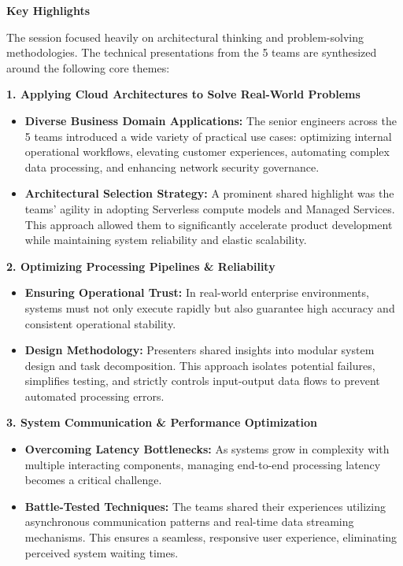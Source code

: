 \vspace{0.5em}\noindent\textbf{Key Highlights}

The session focused heavily on architectural thinking and
problem-solving methodologies. The technical presentations from the 5
teams are synthesized around the following core themes:

\vspace{0.5em}\noindent\textbf{1. Applying Cloud Architectures to Solve Real-World Problems}

\begin{itemize}
\tightlist
\item
  \textbf{Diverse Business Domain Applications:} The senior engineers
  across the 5 teams introduced a wide variety of practical use cases:
  optimizing internal operational workflows, elevating customer
  experiences, automating complex data processing, and enhancing network
  security governance.
\item
  \textbf{Architectural Selection Strategy:} A prominent shared
  highlight was the teams' agility in adopting Serverless compute models
  and Managed Services. This approach allowed them to significantly
  accelerate product development while maintaining system reliability
  and elastic scalability.
\end{itemize}

\vspace{0.5em}\noindent\textbf{2. Optimizing Processing Pipelines \& Reliability}

\begin{itemize}
\tightlist
\item
  \textbf{Ensuring Operational Trust:} In real-world enterprise
  environments, systems must not only execute rapidly but also guarantee
  high accuracy and consistent operational stability.
\item
  \textbf{Design Methodology:} Presenters shared insights into modular
  system design and task decomposition. This approach isolates potential
  failures, simplifies testing, and strictly controls input-output data
  flows to prevent automated processing errors.
\end{itemize}

\vspace{0.5em}\noindent\textbf{3. System Communication \& Performance Optimization}

\begin{itemize}
\tightlist
\item
  \textbf{Overcoming Latency Bottlenecks:} As systems grow in complexity
  with multiple interacting components, managing end-to-end processing
  latency becomes a critical challenge.
\item
  \textbf{Battle-Tested Techniques:} The teams shared their experiences
  utilizing asynchronous communication patterns and real-time data
  streaming mechanisms. This ensures a seamless, responsive user
  experience, eliminating perceived system waiting times.
\end{itemize}

